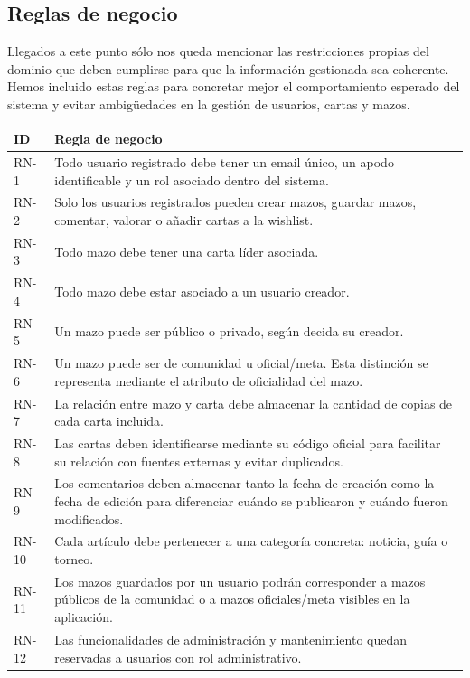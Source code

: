 \documentclass[10pt]{article}
\begin{document}
	\subsection{Reglas de negocio}
	Llegados a este punto sólo nos queda mencionar las restricciones propias del dominio que deben cumplirse para que la información gestionada sea coherente. Hemos incluido estas reglas para concretar mejor el comportamiento esperado del sistema y evitar ambigüedades en la gestión de usuarios, cartas y mazos.
	
	\noindent
	\begin{xltabular}{\textwidth}{|l|X|}
		\hline
		 \textbf{ID} & \textbf{Regla de negocio} \\ \hline
		
		RN-1 & Todo usuario registrado debe tener un email único, un apodo identificable y un rol asociado dentro del sistema. \\ \hline
		RN-2 & Solo los usuarios registrados pueden crear mazos, guardar mazos, comentar, valorar o añadir cartas a la wishlist. \\ \hline
		RN-3 & Todo mazo debe tener una carta líder asociada. \\ \hline
		RN-4 & Todo mazo debe estar asociado a un usuario creador. \\ \hline
		RN-5 & Un mazo puede ser público o privado, según decida su creador. \\ \hline
		RN-6 & Un mazo puede ser de comunidad u oficial/meta. Esta distinción se representa mediante el atributo de oficialidad del mazo. \\ \hline
		RN-7 & La relación entre mazo y carta debe almacenar la cantidad de copias de cada carta incluida. \\ \hline
		RN-8 & Las cartas deben identificarse mediante su código oficial para facilitar su relación con fuentes externas y evitar duplicados. \\ \hline
		RN-9 & Los comentarios deben almacenar tanto la fecha de creación como la fecha de edición para diferenciar cuándo se publicaron y cuándo fueron modificados. \\ \hline
		RN-10 & Cada artículo debe pertenecer a una categoría concreta: noticia, guía o torneo. \\ \hline
		RN-11 & Los mazos guardados por un usuario podrán corresponder a mazos públicos de la comunidad o a mazos oficiales/meta visibles en la aplicación. \\ \hline
		RN-12 & Las funcionalidades de administración y mantenimiento quedan reservadas a usuarios con rol administrativo. \\ \hline
		
	\end{xltabular}
	
\end{document}
